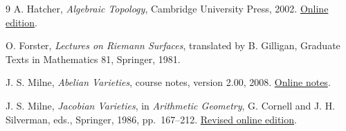 \documentclass[11pt]{article}
\numberwithin{equation}{section}
\theoremstyle{definition}
\begin{document}
\begin{thebibliography}{9}
A. Hatcher, \emph{Algebraic Topology}, Cambridge University Press, 2002.
\href{https://pi.math.cornell.edu/~hatcher/AT/ATpage.html}{Online edition}.

O. Forster, \emph{Lectures on Riemann Surfaces}, translated by B. Gilligan,
Graduate Texts in Mathematics 81, Springer, 1981.

J. S. Milne, \emph{Abelian Varieties}, course notes, version 2.00, 2008.
\href{https://www.jmilne.org/math/CourseNotes/AV.pdf}{Online notes}.

J. S. Milne, \emph{Jacobian Varieties}, in \emph{Arithmetic Geometry},
G. Cornell and J. H. Silverman, eds., Springer, 1986, pp.~167--212.
\href{https://www.jmilne.org/math/xnotes/JVs.html}{Revised online edition}.
\end{thebibliography}
\end{document}
